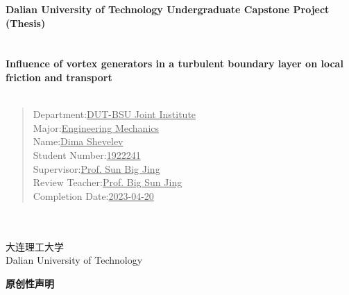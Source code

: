 \documentclass[12pt, a4paper]{article}
\begin{document}
	\begin{titlepage}
		\begin{center}
			\LARGE\textbf{Dalian University of Technology Undergraduate Capstone Project (Thesis)}
			~~~
			\\
			~~~
			\\
			~~~
			\\
			\Large\textbf{Influence of vortex generators in a turbulent boundary layer on local friction and transport}
			~~~
			\\
			~~~
			\\
			\begin{verse}
				\large{Department:\hspace{40pt}\underline{\hspace{1cm}DUT-BSU Joint Institute\hspace{22pt}}\\        
				Major:\hspace{81pt}\underline{\hspace{1cm}Engineering Mechanics\hspace{41pt}}\\  
				Name:\hspace{83pt}\underline{\hspace{1cm}Dima Shevelev\hspace{97pt}}\\                    
				Student Number:\hspace{8pt}\underline{\hspace{1cm}1922241\hspace{143pt}}\\                
				Supervisor:\hspace{50pt}\underline{\hspace{1cm}Prof. Sun Big Jing\hspace{69pt}}\\           
				Review Teacher:\hspace{14pt}\underline{\hspace{1cm}Prof. Big Sun Jing\hspace{69pt}}\\            
				Completion Date:\hspace{4pt}\underline{\hspace{1cm}2023-04-20\hspace{126pt}}}\\  
			\end{verse}
			~~~
			\\
			~~~
			\\
			\Large{大连理工大学}
			~~~
			\\
			Dalian University of Technology
		\end{center}  
	\end{titlepage}
	\newpage
	\pagestyle{fancy}
	\fancyfoot[C]{-\thepage-}
	\begin{center}
		\LARGE\textbf{原创性声明}
	\end{center}
\end{document}
